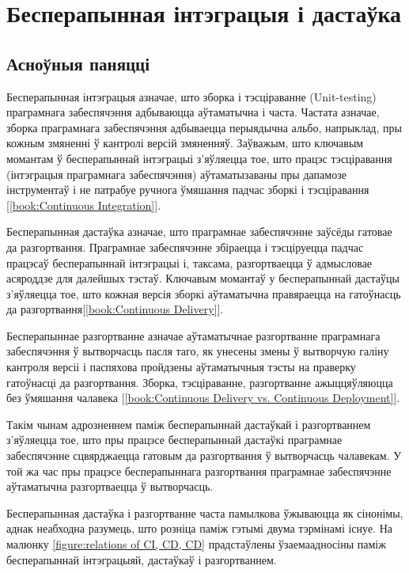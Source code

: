 \section{Бесперапынная інтэграцыя і дастаўка}

\subsection{Асноўныя паняцці}

Бесперапынная інтэграцыя азначае, што зборка і тэсціраванне (Unit-testing)
праграмнага забеспячэння адбываюцца аўтаматычна і часта.
Частата азначае, зборка праграмнага забеспячэння адбываецца перыядычна
альбо, напрыклад, пры кожным змяненні ў кантролі версій змяненняў.
Заўважым, што ключавым момантам ў бесперапыннай інтэграцыі з'яўляецца тое,
што працэс тэсціравання (інтэграцыя праграмнага забеспячэння) аўтаматызаваны
пры дапамозе інструментаў і не патрабуе ручнога ўмяшання падчас
зборкі і тэсціравання%
[\ref{book:Continuous Integration}].

Бесперапынная дастаўка азначае, што праграмнае забеспячэнне
заўсёды гатовае да разгортвання.
Праграмнае забеспячэнне збіраецца і тэсціруецца падчас працэсаў
бесперапыннай інтэграцыі і, таксама, разгортваецца ў адмысловае
асяроддзе для далейшых тэстаў.
Ключавым момантаў у бесперапыннай дастаўцы з'яўляецца тое,
што кожная версія зборкі аўтаматычна правяраецца на гатоўнасць да
разгортвання[\ref{book:Continuous Delivery}].

Бесперапыннае разгортванне азначае аўтаматычнае разгортванне
праграмнага забеспячэння ў вытворчасць пасля таго, як
унесены змены ў вытворчую галіну кантроля версіі і паспяхова пройдзены
аўтаматычныя тэсты на праверку гатоўнасці да разгортвання.
Зборка, тэсціраванне, разгортванне ажыццяўляюцца без ўмяшання чалавека%
[\ref{book:Continuous Delivery vs. Continuous Deployment}].

Такім чынам адрозненнем паміж бесперапыннай дастаўкай і разгортваннем
з'яўляецца тое, што пры працэсе бесперапыннай дастаўкі праграмнае
забеспячэнне сцвярджаецца гатовым да разгортвання ў вытворчасць чалавекам.
У той жа час пры працэсе бесперапыннага разгортвання праграмнае
забеспячэнне аўтаматычна разгортваецца ў вытворчасць.

Бесперапынная дастаўка і разгортванне часта памылкова ўжываюцца як
сінонімы, аднак неабходна разумець, што розніца паміж гэтымі двума
тэрмінамі існуе. На малюнку \ref{figure:relations of CI, CD, CD}
прад\-стаў\-ле\-ны ўзаемаадносіны паміж бесперапыннай інтэграцыяй,
дастаўкаў і разгортваннем.

